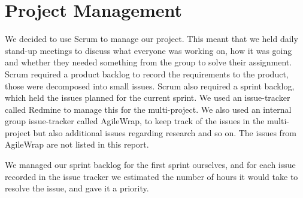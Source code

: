 \section{Project Management}\label{spr1_projmana}
We decided to use Scrum to manage our project. This meant that we held daily stand-up meetings to discuss what everyone was working on, how it was going and whether they needed something from the group to solve their assignment. Scrum required a product backlog to record the requirements to the product, those were decomposed into small issues. Scrum also required a sprint backlog, which held the issues planned for the current sprint. We used an issue-tracker called Redmine to manage this for the multi-project. We also used an internal group issue-tracker called AgileWrap, to keep track of the issues in the multi-project but also additional issues regarding research and so on. The issues from AgileWrap are not listed in this report.

We managed our sprint backlog for the first sprint ourselves, and for each issue recorded in the issue tracker we estimated the number of hours it would take to resolve the issue, and gave it a priority.